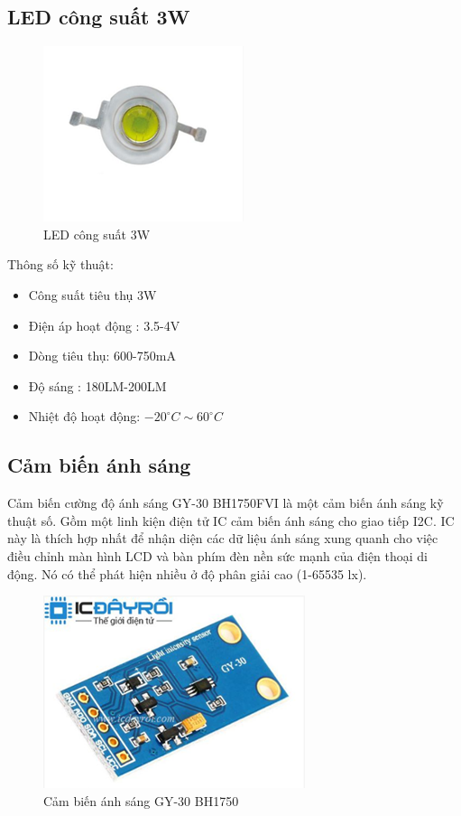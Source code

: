 \subsection{LED công suất 3W}
\begin{figure}[htp]
	\centering
	\includegraphics[scale=1]{Chapters/Chapter4/Images/Led3W.png}
	\caption{LED công suất 3W}
	\label{fig:C43W}
\end{figure}
Thông số kỹ thuật:
\begin{itemize}
\item Công suất tiêu thụ 3W
\item Điện áp hoạt động : 3.5-4V
\item Dòng tiêu thụ: 600-750mA
\item Độ sáng : 180LM-200LM
\item Nhiệt độ hoạt động: $ -20^{\circ}C \sim 60^{\circ}C $ \end{itemize}

\subsection{Cảm biến ánh sáng}
Cảm biến cường độ ánh sáng GY-30 BH1750FVI là một cảm biến ánh sáng kỹ thuật số. Gồm một linh kiện điện tử IC cảm biến ánh sáng cho giao tiếp I2C. IC này là thích hợp nhất để nhận diện các dữ liệu ánh sáng xung quanh cho việc điều chỉnh màn hình LCD và bàn phím đèn nền sức mạnh của điện thoại di động. Nó có thể phát hiện nhiều ở độ phân giải cao (1-65535 lx).
\begin{figure}[ht]
	\centering
	\includegraphics[scale=1]{Chapters/Chapter4/Images/Cambien.png}
	\caption{Cảm biến ánh sáng GY-30 BH1750}
	\label{fig:Cambiengy}
\end{figure}

